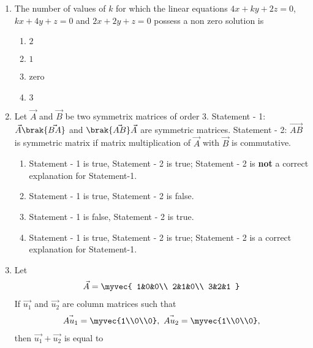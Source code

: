\begin{enumerate}
    \item The number of values of $k$ for which the linear equations $4x + ky + 2z = 0$, $kx + 4y + z = 0$ and $2x + 2y + z=0$ possess a non zero solution is 
	\hfill {}{\par}
\begin{multicols}{2}
        \begin{enumerate}
                \item $2$
                \item $1$
                \item zero
                \item $3$
        \end{enumerate}
\end{multicols}
%
    \item Let $\vec{A}$ and $\vec{B}$ be two symmetrix matrices of order $3$.
	\newline
	{Statement - 1:} $\vec{A}\brak{\vec{BA}}$ and $\brak{\vec{AB}}\vec{A}$ are symmetric matrices. 
	\newline
	{Statement - 2:} $\vec{AB}$ is symmetric matrix if matrix multiplication of $\vec{A}$ with $\vec{B}$ is commutative.
%
	\begin{enumerate}
		\item Statement - 1 is true, Statement - 2 is true; Statement - 2 is \textbf{not} a correct explanation for Statement-1. 
	    	\item Statement - 1 is true, Statement - 2 is false. 
	    	\item Statement - 1 is false, Statement - 2 is true.
	    	\item Statement - 1 is true, Statement - 2 is true; Statement - 2 is a correct explanation for Statement-1. 
	\end{enumerate}
%
	\item Let \begin{align*}
	\vec{A} = \myvec{ 
		1&0&0\\
		2&1&0\\
		3&2&1
	}
	\end{align*} If $\vec{u_1}$ and $\vec{u_2}$ are column matrices such that
	\begin{align*}
		\vec{Au_1} = \myvec{1\\0\\0},\
		\vec{Au_2} = \myvec{1\\0\\0},
	\end{align*} then $\vec{u_1} + \vec{u_2}$ is equal to

\end{enumerate}
